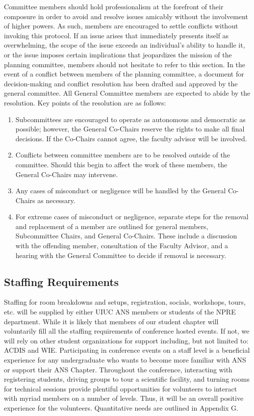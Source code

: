 Committee members should hold professionalism at the forefront of their composure in order to avoid and resolve issues amicably without the involvement of higher powers. As such, members are encouraged to settle conflicts without invoking this protocol. If an issue arises that immediately presents itself as overwhelming, the scope of the issue exceeds an individual’s ability to handle it, or the issue imposes certain implications that jeopardizes the mission of the planning committee, members should not hesitate to refer to this section. In the event of a conflict between members of the planning committee, a document for decision-making and
conflict resolution has been drafted and approved by the general committee. All General Committee members
are expected to abide by the resolution. Key points of the resolution are as follows:
\begin{enumerate}
	\item Subcommittees are encouraged to operate as autonomous and democratic as possible; however, the General
	Co-Chairs reserve the rights to make all final decisions. If the Co-Chairs cannot agree, the faculty advisor will be involved.
	\item Conflicts between committee members are to be resolved outside of the committee. Should this begin to
	affect the work of these members, the General Co-Chairs may intervene.
	\item Any cases of misconduct or negligence will be handled by the General Co-Chairs as necessary.
	\item For extreme cases of misconduct or negligence, separate steps for the removal and replacement of a
	member are outlined for general members, Subcommittee Chairs, and General Co-Chairs. These include
	a discussion with the offending member, consultation of the Faculty Advisor, and a hearing with the
	General Committee to decide if removal is necessary.
\end{enumerate}

\subsection{Staffing Requirements}
Staffing for room breakdowns and setups, registration, socials, workshops, tours, etc.  will be supplied by either UIUC ANS members or students of the NPRE department. While it is likely that members of our student chapter will voluntarily fill all the staffing requirements of conference hosted events. If not, we will rely on other student organizations for support including, but not limited to: ACDIS and WIE. Participating in conference events on a staff level is a beneficial experience for any undergraduate who wants to become more familiar with ANS or support their ANS Chapter. Throughout the conference, interacting with registering students, driving groups to tour a scientific facility, and turning rooms for technical sessions provide plentiful opportunities for volunteers to interact with myriad members on a number of levels. Thus, it will be an overall positive experience for the volunteers. Quantitative needs are outlined in Appendix G.


